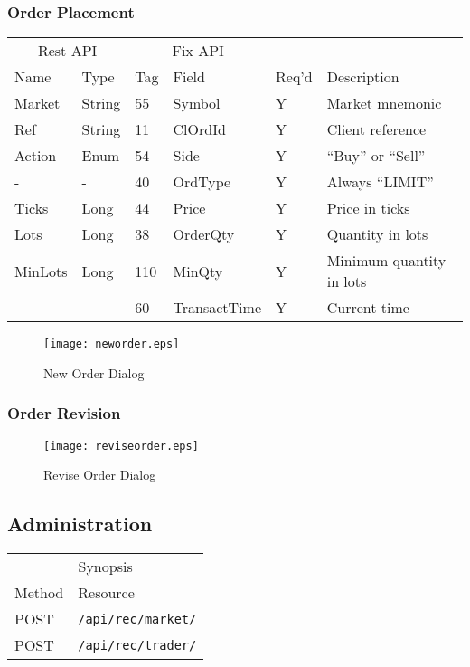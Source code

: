 \documentclass[11pt,a4paper]{article}
\begin{document}
\subsubsection{Order Placement}

\vspace{5mm}
\begin{tabular}{ll|ll|ll}
\multicolumn{2}{c}{Rest API}&\multicolumn{2}{c}{Fix API}\\
Name&Type&Tag&Field&Req'd&Description\\
\hline
Market&String&55&Symbol&Y&Market mnemonic\\
Ref&String&11&ClOrdId&Y&Client reference\\
Action&Enum&54&Side&Y&``Buy'' or ``Sell''\\
-&-&40&OrdType&Y&Always ``LIMIT''\\
Ticks&Long&44&Price&Y&Price in ticks\\
Lots&Long&38&OrderQty&Y&Quantity in lots\\
MinLots&Long&110&MinQty&Y&Minimum quantity in lots\\
-&-&60&TransactTime&Y&Current time\\
\end{tabular}
\vspace{5mm}

\begin{figure}[H]
\centering
\texttt{[image: neworder.eps]}
\caption{New Order Dialog}
\end{figure}

\subsubsection{Order Revision}

\begin{figure}[H]
\centering
\texttt{[image: reviseorder.eps]}
\caption{Revise Order Dialog}
\end{figure}

\subsection{Administration}

\vspace{5mm}
\begin{tabular}{ll}
\multicolumn{2}{c}{Synopsis}\\
Method&Resource\\
\hline
POST&\texttt{/api/rec/market/}\\
POST&\texttt{/api/rec/trader/}\\
\end{tabular}
\vspace{5mm}
\end{document}
